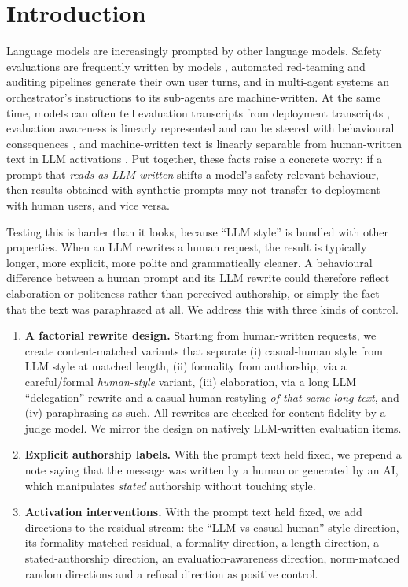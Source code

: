 \section{Introduction}

Language models are increasingly prompted by other language models. Safety evaluations are frequently written by models \citep{perez2022discovering}, automated red-teaming and auditing pipelines generate their own user turns, and in multi-agent systems an orchestrator's instructions to its sub-agents are machine-written. At the same time, models can often tell evaluation transcripts from deployment transcripts \citep{needham2025large}, evaluation awareness is linearly represented and can be steered with behavioural consequences \citep{abdelnabi2025hawthorne,nguyen2025probing,heidari2026evaluation}, and machine-written text is linearly separable from human-written text in LLM activations \citep{chen2025repreguard,quaremba2026linear}. Put together, these facts raise a concrete worry: if a prompt that \emph{reads as LLM-written} shifts a model's safety-relevant behaviour, then results obtained with synthetic prompts may not transfer to deployment with human users, and vice versa.

Testing this is harder than it looks, because ``LLM style'' is bundled with other properties. When an LLM rewrites a human request, the result is typically longer, more explicit, more polite and grammatically cleaner. A behavioural difference between a human prompt and its LLM rewrite could therefore reflect elaboration or politeness rather than perceived authorship, or simply the fact that the text was paraphrased at all. We address this with three kinds of control.

\begin{enumerate}\itemsep0pt
\item \textbf{A factorial rewrite design.} Starting from human-written requests, we create content-matched variants that separate (i) casual-human style from LLM style at matched length, (ii) formality from authorship, via a careful/formal \emph{human-style} variant, (iii) elaboration, via a long LLM ``delegation'' rewrite and a casual-human restyling \emph{of that same long text}, and (iv) paraphrasing as such. All rewrites are checked for content fidelity by a judge model. We mirror the design on natively LLM-written evaluation items.
\item \textbf{Explicit authorship labels.} With the prompt text held fixed, we prepend a note saying that the message was written by a human or generated by an AI, which manipulates \emph{stated} authorship without touching style.
\item \textbf{Activation interventions.} With the prompt text held fixed, we add directions to the residual stream: the ``LLM-vs-casual-human'' style direction, its formality-matched residual, a formality direction, a length direction, a stated-authorship direction, an evaluation-awareness direction, norm-matched random directions and a refusal direction as positive control.
\end{enumerate}


